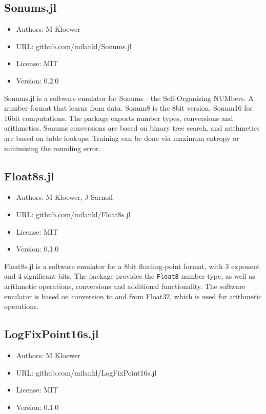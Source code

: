 \subsection{Sonums.jl}

\begin{itemize}
    \setlength\itemsep{-5pt}
    \item Authors: M Kloewer
    \item URL: github.com/milankl/Sonums.jl
    \item License: MIT
    \item Version: 0.2.0
\end{itemize}

Sonums.jl is a software emulator for Sonums - the Self-Organizing NUMbers. A number format that learns from data. Sonum8 is the 8bit version, Sonum16 for 16bit computations.  The package exports number types, conversions and arithmetics. Sonums conversions are based on binary tree search, and arithmetics are based on table lookups. Training can be done via maximum entropy or minimising the rounding error.

\subsection{Float8s.jl}

\begin{itemize}
    \setlength\itemsep{-5pt}
    \item Authors: M Kloewer, J Sarnoff
    \item URL: github.com/milankl/Float8s.jl
    \item License: MIT
    \item Version: 0.1.0
\end{itemize}

Float8s.jl is a software emulator for a 8bit floating-point format, with 3 exponent and 4 significant bits. The package provides the \texttt{Float8} number type, as well as arithmetic operations, conversions and additional functionality. The software emulator is based on conversion to and from Float32, which is used for arithmetic operations.

\subsection{LogFixPoint16s.jl}

\begin{itemize}
    \setlength\itemsep{-5pt}
    \item Authors: M Kloewer
    \item URL: github.com/milankl/LogFixPoint16s.jl
    \item License: MIT
    \item Version: 0.1.0
\end{itemize}

